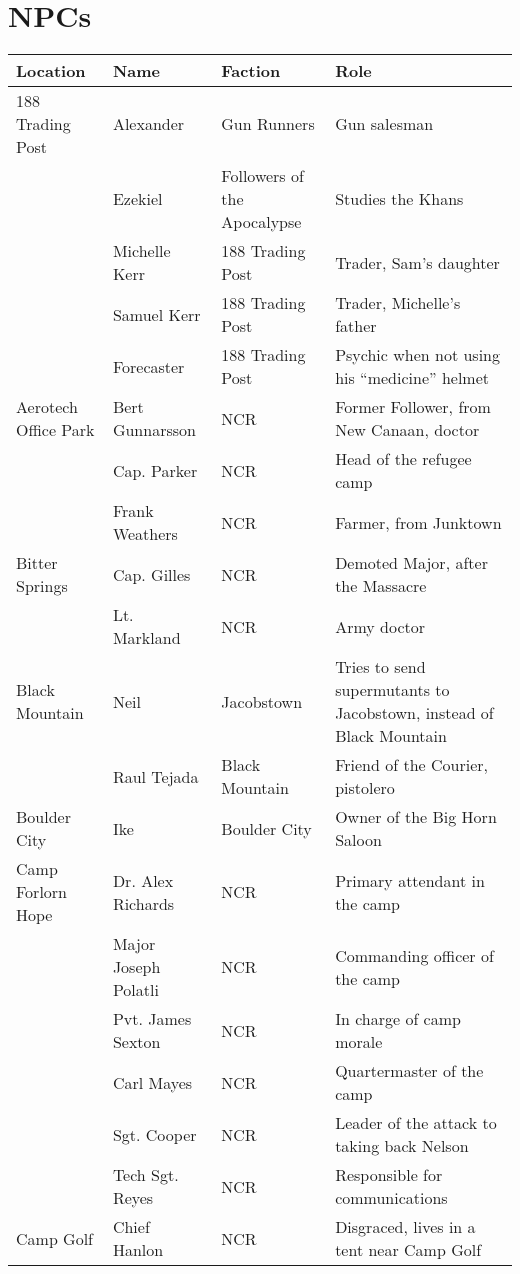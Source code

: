 \section{NPCs}

\begin{longtable}{|p{3cm}|p{3cm}|p{3cm}|p{6cm}|} 
\hline 
\bfseries Location & \bfseries Name & \bfseries Faction & \bfseries Role \\
\hline 
\endhead 
188 Trading Post & Alexander & Gun Runners & Gun salesman \\
\hfill & Ezekiel & Followers of the Apocalypse & Studies the Khans \\
\hfill & Michelle Kerr & 188 Trading Post & Trader, Sam's daughter \\
\hfill & Samuel Kerr & 188 Trading Post & Trader, Michelle's father \\
\hfill & Forecaster & 188 Trading Post & Psychic when not using his ``medicine'' helmet \\
Aerotech Office Park & Bert Gunnarsson & NCR & Former Follower, from New Canaan, doctor \\
\hfill & Cap. Parker & NCR & Head of the refugee camp \\
\hfill & Frank Weathers & NCR & Farmer, from Junktown \\
Bitter Springs & Cap. Gilles & NCR & Demoted Major, after the Massacre \\
\hfill & Lt. Markland & NCR & Army doctor \\
Black Mountain & Neil & Jacobstown & Tries to send supermutants to Jacobstown, instead of Black Mountain \\
\hfill & Raul Tejada & Black Mountain & Friend of the Courier, pistolero \\
Boulder City & Ike & Boulder City & Owner of the Big Horn Saloon \\
Camp Forlorn Hope & Dr. Alex Richards & NCR & Primary attendant in the camp \\
\hfill & Major Joseph Polatli & NCR & Commanding officer of the camp \\
\hfill & Pvt. James Sexton & NCR & In charge of camp morale \\
\hfill & Carl Mayes & NCR & Quartermaster of the camp \\
\hfill & Sgt. Cooper & NCR & Leader of the attack to taking back Nelson \\
\hfill & Tech Sgt. Reyes & NCR & Responsible for communications \\
Camp Golf & Chief Hanlon & NCR & Disgraced, lives in a tent near Camp Golf \\

\end{longtable}
